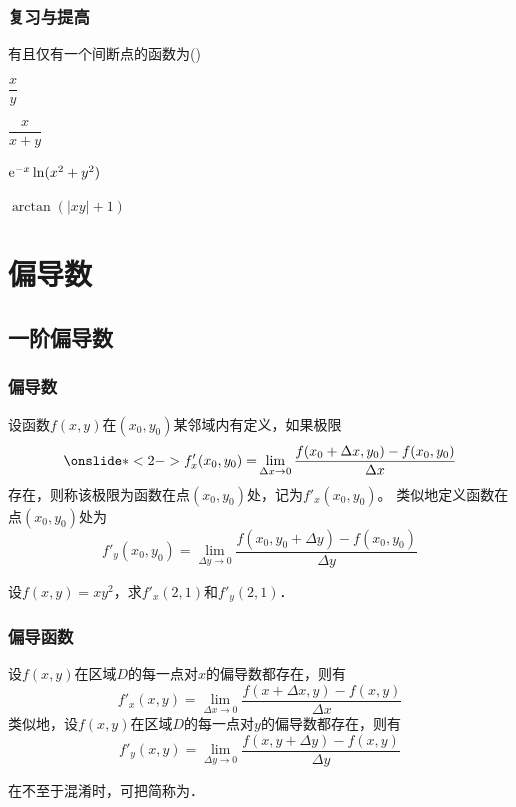 \documentclass[14pt,notheorems,leqno,xcolor={rgb}]{beamer} %
\begin{document}
\begin{frame}
\frametitle{复习与提高}
\begin{choice}
有且仅有一个间断点的函数为\dotfill()
\begin{choicehalf}
  \item $\dfrac{x}{y}$ ~
  \item $\dfrac{x}{x+y}$ ~
  \item $\mathrm{e}^{-x}\ln(x^2+y^2)$ ~
  \item $\arctan(|xy|+1)$ ~
\end{choicehalf} 
\end{choice}
\end{frame}

\section{偏导数}

\subsection{一阶偏导数}

\begin{frame}
\frametitle{偏导数}
\begin{definition}
设函数$f(x,y)$在$(x_0,y_0)$某邻域内有定义，如果极限
\[ \onslide*<2->{f'_x(x_0,y_0)=}\lim_{\Delta x\to0} \frac{f(x_0+\Delta x,y_0)-f(x_0,y_0)}{\Delta x}\]
存在，则称该极限为函数在点$(x_0,y_0)$处，记为$f'_x(x_0,y_0)$。
\ppause
{}类似地定义函数在点$(x_0,y_0)$处为
\[ f'_y(x_0,y_0) = \lim_{\Delta y\to0} \frac{f(x_0,y_0+\Delta y)-f(x_0,y_0)}{\Delta y}\]
\end{definition}
\vpause{}
\begin{example}
设$f(x,y)=xy^2$，求$f'_x(2,1)$和$f'_y(2,1)$．
\end{example}
\end{frame}

\begin{frame}
\frametitle{偏导函数}
\begin{definition}
设$f(x,y)$在区域$D$的每一点对$x$的偏导数都存在，则有
\[ f'_x(x,y)=\lim_{\Delta x\to0} \frac{f(x+\Delta x,y)-f(x,y)}{\Delta x}\]
\ppause
类似地，设$f(x,y)$在区域$D$的每一点对$y$的偏导数都存在，则有
\[ f'_y(x,y) = \lim_{\Delta y\to0} \frac{f(x,y+\Delta y)-f(x,y)}{\Delta y}\]
\end{definition}
\vpause
\begin{remark*}
在不至于混淆时，可把简称为．
\end{remark*}
\end{frame}
\end{document}
